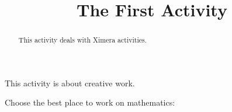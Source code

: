 \documentclass{ximera}
\title{The First Activity}
\begin{document}
  
\begin{abstract}  
	This activity deals with Ximera activities.
\end{abstract}  
\maketitle  

This activity is about creative work.  
\begin{exercise}  
  Choose the best place to work on mathematics: 
  \begin{multipleChoice}  
  \end{multipleChoice}  
\end{exercise}  
\end{document}
